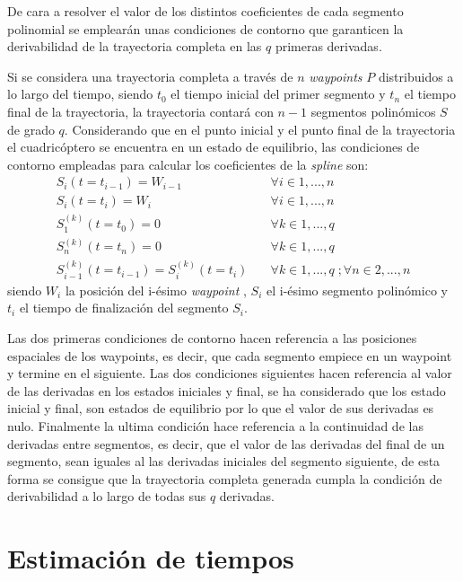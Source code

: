 De cara a resolver el valor de los distintos coeficientes de cada segmento polinomial se emplearán unas condiciones de contorno que garanticen la derivabilidad de la trayectoria completa en las $q$ primeras derivadas. 

Si se considera una trayectoria completa a través de $n$ \textit{waypoints} $P$ distribuidos a lo largo del tiempo, siendo $t_0$ el tiempo inicial del primer segmento y $t_n$ el tiempo final de la trayectoria, la trayectoria contará con $n-1$ segmentos polinómicos $S$ de grado $q$. Considerando que en el punto inicial y el punto final de la trayectoria el cuadricóptero se encuentra en un estado de equilibrio, las condiciones de contorno empleadas para calcular los coeficientes de la \textit{spline} son:
\begin{equation}
\begin{array}{ll}
	S_i (t = t_{i-1}) = W_{i-1} \quad &\forall i \in 1,...,n\\
	S_i (t = t_{i}) = W_i \quad &\forall i \in 1,...,n\\
	S_1^{(k)}(t = t_0) = 0 \quad &\forall k \in 1,...,q\\
	S_n^{(k)}(t = t_n) = 0 \quad &\forall k \in 1,...,q\\
	S_{i-1}^{(k)}(t = t_{i-1}) = S_{i}^{(k)}(t = t_{i})  \quad &\forall k \in 1,...,q \;; \forall n \in 2,...,n
\end{array}
\end{equation}
 siendo $W_i$ la posición del i-ésimo \textit{waypoint} , $S_i$ el i-ésimo segmento polinómico y  $t_i$ el tiempo de finalización del segmento $S_i$.
 
 Las dos primeras condiciones de contorno hacen referencia a las posiciones espaciales de los waypoints, es decir, que cada segmento empiece en un waypoint  y termine en el siguiente. Las dos condiciones siguientes hacen referencia al valor de las derivadas en los estados iniciales y final, se ha considerado que los estado inicial y final, son estados de equilibrio por lo que el valor de sus derivadas es nulo. Finalmente la ultima condición hace referencia a la continuidad de las derivadas entre segmentos, es decir, que el valor de las derivadas del final de un segmento, sean iguales al las derivadas iniciales del segmento siguiente, de esta forma se consigue que la trayectoria completa generada cumpla la condición de derivabilidad a lo largo de todas sus $q$ derivadas.

\section{Estimación de tiempos}\label{sec:estimacion_tiempos}


